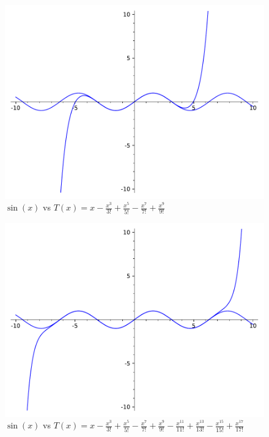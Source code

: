 \begin{enumerate}
{\begin{figure}[H]
				\includegraphics{cviceni_8/fig/taylor_sin_9.pdf}
				\caption{$\sin(x)$ vs $T(x) = x - \frac{x^3}{3!} + \frac{x^5}{5!} - \frac{x^7}{7!} + \frac{x^9}{9!}$}
				\label{fig:taylor_9_sin}
			\end{figure}
			\begin{figure}[H]
				\centering
				\includegraphics{cviceni_8/fig/taylor_sin_17.pdf}
				\caption{$\sin(x)$ vs $T(x) = x - \frac{x^3}{3!} + \frac{x^5}{5!} - \frac{x^7}{7!} + \frac{x^9}{9!} - \frac{x^{11}}{11!} + \frac{x^{13}}{13!} - \frac{x^{15}}{15!} + \frac{x^{17}}{17!}$}
				\label{fig:taylor_17_sin}
			\end{figure}
		}

\end{enumerate}

